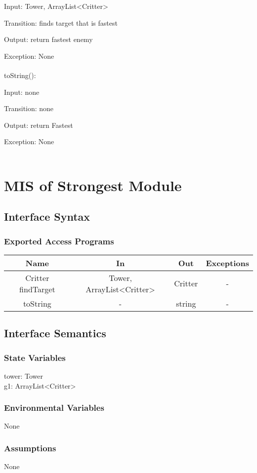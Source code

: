 \documentclass[12,english]{article}
\begin{document}
		Input: Tower, ArrayList<Critter>
		
		Transition: finds target that is fastest
		
		Output: return fastest enemy
		
		Exception: None\\
		\\
		toString():
		
		Input: none
		
		Transition: none
		
		Output: return Fastest
		
		Exception: None\\
		\\
\section{MIS of Strongest Module}
	\subsection{Interface Syntax}
		\subsubsection{Exported Access Programs}
		
	\begin{tabular}[pos]{|c|c|c|c|}
	\hline
	\textbf{Name}& \textbf{In} & \textbf{Out} & \textbf{Exceptions} \\ 
	\hline
	Critter findTarget & Tower, ArrayList<Critter> & Critter & - \\ \hline
	toString & - & string & - \\ \hline
					
	\end{tabular}		
		
	\subsection{Interface Semantics}
		\subsubsection{State Variables}
		tower: Tower\\
	    g1: ArrayList<Critter>\\
		\subsubsection{Environmental Variables}
		None
		\subsubsection{Assumptions}
        None
\end{document}
